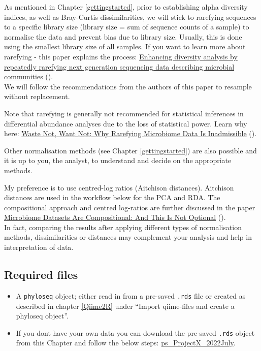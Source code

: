 \documentclass[
]{book}
\providecommand{\tightlist}{%
  \setlength{\itemsep}{0pt}\setlength{\parskip}{0pt}}
\begin{document}
As mentioned in Chapter \ref{gettingstarted}, prior to establishing alpha diversity indices, as well as Bray-Curtis dissimilarities, we will stick to rarefying sequences to a specific library size (library size = sum of sequence counts of a sample) to normalise the data and prevent bias due to library size. Usually, this is done using the smallest library size of all samples. If you want to learn more about rarefying - this paper explains the process: \href{https://www.nature.com/articles/s41598-021-01636-1}{Enhancing diversity analysis by repeatedly rarefying next generation sequencing data describing microbial communities} (\citet{Cameron2021}).\\
We will follow the recommendations from the authors of this paper to resample without replacement.

Note that rarefying is generally not recommended for statistical inferences in differential abundance analyses due to the loss of statistical power. Learn why here: \href{https://journals.plos.org/ploscompbiol/article?id=10.1371/journal.pcbi.1003531}{Waste Not, Want Not: Why Rarefying Microbiome Data Is Inadmissible} (\citet{McMurdie2014}).

Other normalisation methods (see Chapter \ref{gettingstarted}) are also possible and it is up to you, the analyst, to understand and decide on the appropriate methods.

My preference is to use centred-log ratios (Aitchison distances). Aitchison distances are used in the workflow below for the PCA and RDA. The compositional approach and centred log-ratios are further discussed in the paper \href{https://doi.org/10.3389/fmicb.2017.02224}{Microbiome Datasets Are Compositional: And This Is Not Optional} (\citet{Gloor2017}).\\
In fact, comparing the results after applying different types of normalisation methods, dissimilarities or distances may complement your analysis and help in interpretation of data.

\hypertarget{required-files}{%
\subsection{Required files}\label{required-files}}

\begin{itemize}
\tightlist
\item
  A \texttt{phyloseq} object; either read in from a pre-saved \texttt{.rds} file or created as described in chapter \ref{Qiime2R} under ``Import qiime-files and create a phyloseq object''.\\
\item
  If you dont have your own data you can download the pre-saved \texttt{.rds} object from this Chapter and follow the below steps: \href{./ps_ProjectX_2022July}{ps\_ProjectX\_2022July}.
\end{itemize}
\end{document}
